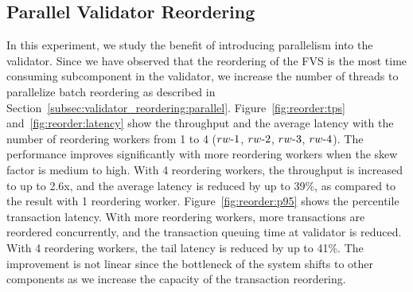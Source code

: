 \subsection{Parallel Validator Reordering}
In this experiment, we study the benefit of introducing parallelism into the validator. Since we have observed that the reordering of the FVS is the most time consuming subcomponent in the validator, we increase the number of threads to parallelize batch reordering as described in Section~\ref{subsec:validator_reordering:parallel}. 
Figure~\ref{fig:reorder:tps} and~\ref{fig:reorder:latency} show the throughput
and the average latency with the number of reordering workers from 1 to 4
($rw\hbox{-}1$, $rw\hbox{-}2$, $rw\hbox{-}3$, $rw\hbox{-}4$). The performance improves significantly with more reordering workers when the skew factor is medium to high. With 4 reordering workers, the throughput is increased to up to 2.6x, and the average latency is reduced by up to 39\%, as compared to the result with 1 reordering worker. Figure~\ref{fig:reorder:p95} shows the percentile transaction latency. With more reordering workers, more transactions are reordered concurrently, and the transaction queuing time at validator is reduced. With 4 reordering workers, the tail latency is reduced by up to 41\%. The improvement is not linear since the bottleneck of the system shifts to other
components as we increase the capacity of the transaction reordering.

